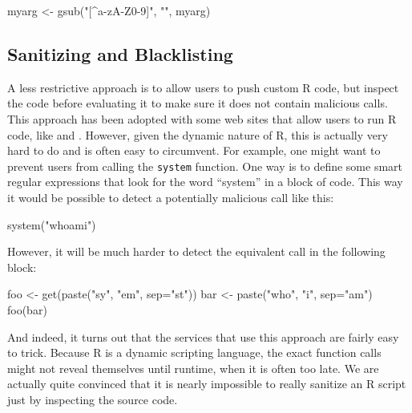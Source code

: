 \documentclass[article]{jss}
\newcommand{\R}{\textsf{R}\xspace}
\begin{document}
\begin{CodeChunk}
\begin{CodeInput}
myarg <- gsub("[^a-zA-Z0-9]", "", myarg)
\end{CodeInput}
\end{CodeChunk}


\subsection{Sanitizing and Blacklisting}

A less restrictive approach is to allow users to push custom \R code, but
inspect the code before evaluating it to make sure it does not contain malicious calls.
This approach has been adopted with some web sites that allow users to run
\R code, like \cite{banfield1999rweb} and \cite{cloudstat}. However,
given the dynamic nature of \R, this is actually very hard to do and
is often easy to circumvent. For example, one might want to prevent users from
calling the \texttt{system} function. One way is to define some smart regular
expressions that look for the word ``system'' in a block of code. This way
it would be possible to detect a potentially malicious call like this:

\begin{CodeChunk}
\begin{CodeInput}
system("whoami")
\end{CodeInput}
\end{CodeChunk}

However, it will be much harder to detect the equivalent call in the following
block:

\begin{CodeChunk}
\begin{CodeInput}
foo <- get(paste("sy", "em", sep="st"))
bar <- paste("who", "i", sep="am")
foo(bar)
\end{CodeInput}
\end{CodeChunk}

And indeed, it turns out that the services that use this approach are fairly
easy to trick. Because \R is a dynamic scripting language, the exact
function calls might not reveal themselves until runtime, when it is often too
late. We are actually quite convinced that it is nearly impossible to really
sanitize an \R script just by inspecting the source code.
\end{document}
